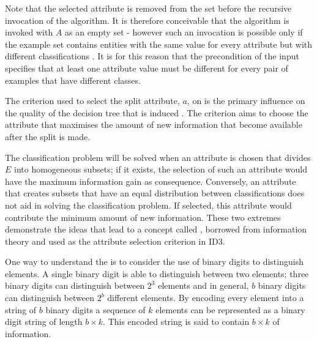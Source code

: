 Note that the selected attribute is removed from the set before the recursive invocation of the algorithm. It is therefore conceivable that the algorithm is invoked with $A$ as an empty set - however such an invocation is possible only if the example set contains entities with the same value for every attribute but with different classifications \cite{bratko:learning}.  It is for this reason that the precondition of the input specifies that at least one attribute value must be different for every pair of examples that have different classes.

The criterion used to select the split attribute, $a$, on  is the primary influence on the quality of the decision tree that is induced \cite{kubat:review}. The  criterion aims to choose the attribute that maximises the amount of new information that become available after the split is made. 

The classification problem will be solved when an attribute is chosen that divides $E$ into homogeneous subsets; if it exists, the selection of such an attribute would have the maximum information gain as consequence.  Conversely, an attribute that creates subsets that have an equal distribution between classifications does not aid in solving the classification problem. If selected, this attribute would contribute the minimum amount of new information. These two extremes demonstrate the ideas that lead to a concept called  \cite{shannon:theory}, borrowed from information theory and used as the attribute selection criterion in ID3.


One way to understand the  is to consider the use of binary digits to distinguish elements.  A single  binary digit is able to distinguish between two elements; three binary digits can distinguish between $2^3$ elements and in general, $b$ binary digits can distinguish between $2^b$ different elements. By encoding every element into a string of $b$ binary digits a sequence of $k$ elements can be represented as a binary digit string of length $b \times k$.  This encoded string is said to contain $b \times k$  of information.  

